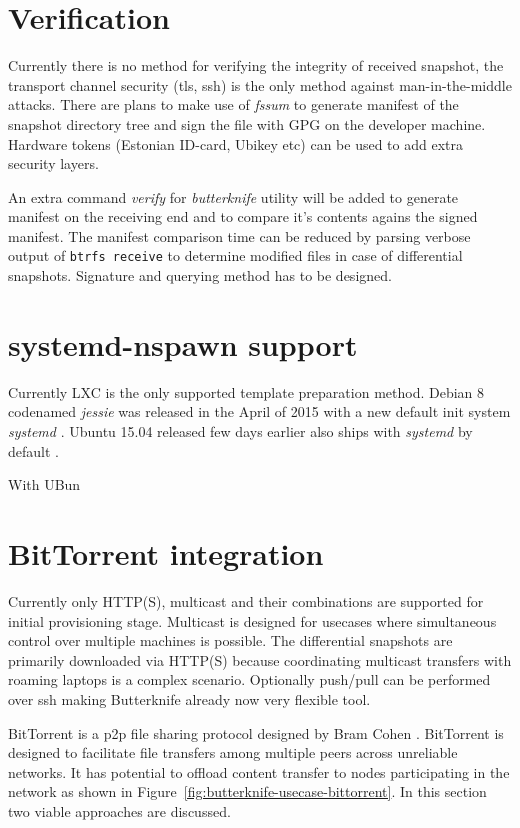\documentclass[a4paper,11pt]{kth-mag}
\begin{document}
\section{Verification}

Currently there is no method for verifying the integrity
of received snapshot, the transport channel security
(\acrshort{tls}, \acrshort{ssh}) is the only method against man-in-the-middle attacks.
There are plans to make use of \emph{fssum} to generate
manifest of the snapshot directory tree and
sign the file with GPG on the developer machine.
Hardware tokens (Estonian ID-card, Ubikey etc) can be used
to add extra security layers.

An extra command \emph{verify} for
\emph{butterknife} utility will be added
to generate manifest on the receiving end and
to compare it's contents agains the signed manifest.
The manifest comparison time can be reduced by
parsing verbose output of \lstinline!btrfs receive!
to determine modified files
in case of differential snapshots.
Signature and querying method has to be designed.

\section{systemd-nspawn support}

Currently LXC is the only supported template preparation method.
Debian 8 codenamed \emph{jessie} was released in the April of 2015
with a new default init system \emph{systemd}
\cite{debian-jessie-released}.
Ubuntu 15.04 released few days earlier also
ships with \emph{systemd} by default
\cite{ubuntu-vivid-vervet-released}.

With UBun

\section{BitTorrent integration}

Currently only HTTP(S), multicast and their combinations are supported
for initial provisioning stage.
Multicast is designed for usecases where simultaneous
control over multiple machines is possible.
The differential snapshots are primarily downloaded
via HTTP(S) because coordinating multicast
transfers with roaming laptops is a complex scenario.
Optionally push/pull can be performed over \acrshort{ssh}
making Butterknife already now very flexible tool.

BitTorrent is a \acrfull{p2p} file sharing protocol
designed by Bram Cohen \cite{incentives-build-robustness-in-bittorrent}.
BitTorrent is designed to facilitate file transfers among multiple peers
across unreliable networks.
It has potential to offload content transfer to nodes
participating in the network as shown in
Figure~\ref{fig:butterknife-usecase-bittorrent}.
In this section two viable approaches are discussed.
\end{document}
